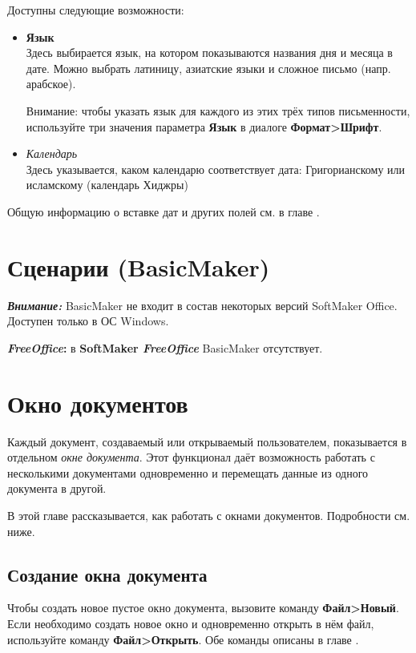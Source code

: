 ﻿\documentclass[a4paper,10pt]{article}
\begin{document}
 Доступны следующие возможности:
 
 \begin{itemize}
  \item \textbf{Язык}\\
  Здесь выбирается язык, на котором показываются названия дня и месяца в дате. Можно выбрать латиницу, азиатские языки и сложное письмо (напр. арабское).
  
  Внимание: чтобы указать язык для каждого из этих трёх типов письменности, используйте три значения параметра \textbf{Язык} в диалоге \textbf{Формат>Шрифт}.
  \item \textit{Календарь}\\
  Здесь указывается, каком календарю соответствует дата: Григорианскому или исламскому (календарь Хиджры)
 \end{itemize}

 Общую информацию о вставке дат и других полей см. в главе .
 
 \section{Сценарии (BasicMaker)} \label{sec:сценарииbasicmaker}
 \begin{mdframed}[backgroundcolor=blue!10]
\textbf{\textit{Внимание:}} BasicMaker не входит в состав некоторых версий SoftMaker Office. Доступен только в ОС Windows.
\end{mdframed}
 
 \begin{mdframed}[backgroundcolor=pink!50]
\textbf{\textit{FreeOffice}:} в \textbf{SoftMaker \textit{FreeOffice}} BasicMaker отсутствует.
\end{mdframed}

 
\section{Окно документов} \label{sec:окнодокументов}
Каждый документ, создаваемый или открываемый пользователем, показывается в отдельном \textit{окне документа}. Этот функционал даёт возможность работать с несколькими документами одновременно и перемещать данные из одного документа в другой.

В этой главе рассказывается, как работать с окнами документов. Подробности см. ниже.

\subsection{Создание окна документа}
Чтобы создать новое пустое окно документа, вызовите команду \textbf{Файл>Новый}. Если необходимо создать новое окно и одновременно открыть в нём файл, используйте команду \textbf{Файл>Открыть}. Обе команды описаны в главе .
\end{document}
